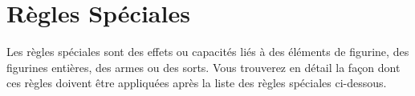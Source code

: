 
\part{Règles Spéciales}
\label{special_rules}

Les règles spéciales sont des effets ou capacités liés à des éléments de figurine, des figurines entières, des armes ou des sorts. Vous trouverez en détail la façon dont ces règles doivent être appliquées après la liste des règles spéciales ci-dessous.

\vspace*{20pt}
\hypertarget{specialrulestable}{%
\begin{framed}
\vspace*{-10pt}
\setlength\columnseprule{0.5pt}
\begin{multicols}{3}\raggedcolumns
\noindent\hyperlink{requirestwohands}{\requirestwohands}\newline
\hyperlink{randomattacks}{\randomattacks{}}\newline
\hyperlink{grindingattacks}{\grindingattacks{}}\newline
\hyperlink{divineattacks}{\divineattacks}\newline
\hyperlink{crushattack}{\crushattack}\newline
\hyperlink{poisonedattacks}{\poisonedattacks}\newline
\hyperlink{flamingattacks}{\flamingattacks}\newline
\hyperlink{lightningattacks}{\lightningattacks}\newline
\hyperlink{magicalattacks}{\magicalattacks}\newline
\hyperlink{sweepingattack}{\sweepingattack}\newline
\hyperlink{penetrating}{\penetrating}\newline
\hyperlink{breathweapon}{\breathweapon{}}\newline
\hyperlink{toxicattacks}{\toxicattacks}\newline
\hyperlink{areaattack}{\areaattack{}}\newline
\hyperlink{vanguard}{\vanguard}\newline
\hyperlink{multiplewounds}{\multiplewounds{}{}}\newline
\hyperlink{hardtarget}{\hardtarget}\newline
\hyperlink{channel}{\channel}\newline
\hyperlink{scoring}{\scoring}\newline
\hyperlink{fastcavalry}{\fastcavalry}\newline

\end{multicols}
\end{framed}}
